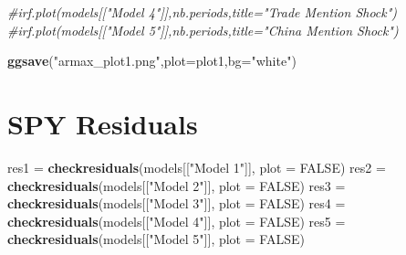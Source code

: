 \documentclass[
]{book}
\newenvironment{Shaded}{\begin{snugshade}}{\end{snugshade}}
\newcommand{\AttributeTok}[1]{\textcolor[rgb]{0.13,0.29,0.53}{#1}}
\newcommand{\CommentTok}[1]{\textcolor[rgb]{0.56,0.35,0.01}{\textit{#1}}}
\newcommand{\ConstantTok}[1]{\textcolor[rgb]{0.56,0.35,0.01}{#1}}
\newcommand{\FunctionTok}[1]{\textcolor[rgb]{0.13,0.29,0.53}{\textbf{#1}}}
\newcommand{\NormalTok}[1]{#1}
\newcommand{\OtherTok}[1]{\textcolor[rgb]{0.56,0.35,0.01}{#1}}
\newcommand{\StringTok}[1]{\textcolor[rgb]{0.31,0.60,0.02}{#1}}
\begin{document}
\begin{Shaded}
\begin{Highlighting}[]
\CommentTok{\#irf.plot(models[["Model 4"]],nb.periods,title="Trade Mention Shock")}
\CommentTok{\#irf.plot(models[["Model 5"]],nb.periods,title="China Mention Shock")}

\FunctionTok{ggsave}\NormalTok{(}\StringTok{"armax\_plot1.png"}\NormalTok{,}\AttributeTok{plot=}\NormalTok{plot1,}\AttributeTok{bg=}\StringTok{"white"}\NormalTok{)}
\end{Highlighting}
\end{Shaded}

\section{SPY Residuals}\label{spy-residuals}

\begin{Shaded}
\begin{Highlighting}[]
\NormalTok{res1 }\OtherTok{=} \FunctionTok{checkresiduals}\NormalTok{(models[[}\StringTok{"Model 1"}\NormalTok{]], }\AttributeTok{plot =} \ConstantTok{FALSE}\NormalTok{)}
\NormalTok{res2 }\OtherTok{=} \FunctionTok{checkresiduals}\NormalTok{(models[[}\StringTok{"Model 2"}\NormalTok{]], }\AttributeTok{plot =} \ConstantTok{FALSE}\NormalTok{)}
\NormalTok{res3 }\OtherTok{=} \FunctionTok{checkresiduals}\NormalTok{(models[[}\StringTok{"Model 3"}\NormalTok{]], }\AttributeTok{plot =} \ConstantTok{FALSE}\NormalTok{)}
\NormalTok{res4 }\OtherTok{=} \FunctionTok{checkresiduals}\NormalTok{(models[[}\StringTok{"Model 4"}\NormalTok{]], }\AttributeTok{plot =} \ConstantTok{FALSE}\NormalTok{)}
\NormalTok{res5 }\OtherTok{=} \FunctionTok{checkresiduals}\NormalTok{(models[[}\StringTok{"Model 5"}\NormalTok{]], }\AttributeTok{plot =} \ConstantTok{FALSE}\NormalTok{)}
\end{Highlighting}
\end{Shaded}
\end{document}
